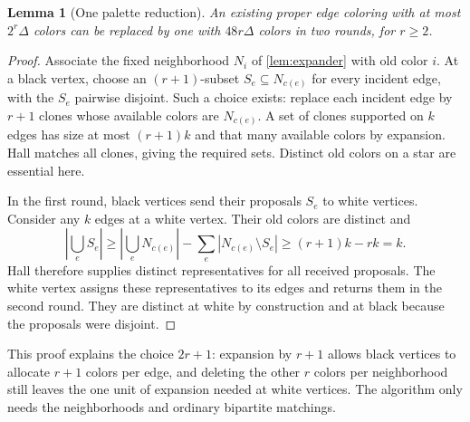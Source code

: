 \documentclass[11pt]{article}
\newtheorem{lemma}[theorem]{Lemma}
\theoremstyle{definition}
\theoremstyle{remark}
\newcommand{\abs}[1]{\left|#1\right|}
\begin{document}
\begin{lemma}[One palette reduction]\label{lem:expanderreduction}
An existing proper edge coloring with at most $2^r\Delta$ colors can be
replaced by one with $48r\Delta$ colors in two rounds, for $r\ge2$.
\end{lemma}
\begin{proof}
Associate the fixed neighborhood $N_i$ of \cref{lem:expander} with old
color $i$. At a black vertex, choose an $(r+1)$-subset $S_e\subseteq
N_{c(e)}$ for every incident edge, with the $S_e$ pairwise disjoint.
Such a choice exists: replace each incident edge by $r+1$ clones whose
available colors are $N_{c(e)}$. A set of clones supported on $k$ edges
has size at most $(r+1)k$ and that many available colors by expansion.
Hall matches all clones, giving the required sets. Distinct old colors
on a star are essential here.

In the first round, black vertices send their proposals $S_e$ to white
vertices. Consider any $k$ edges at a white vertex. Their old colors
are distinct and
\begin{equation}\label{eq:deletedneighbors}
 \abs{\bigcup_e S_e}
 \ge\abs{\bigcup_e N_{c(e)}}-\sum_e\abs{N_{c(e)}\setminus S_e}
 \ge(r+1)k-rk=k.
\end{equation}
Hall therefore supplies distinct representatives for all received
proposals. The white vertex assigns these representatives to its edges
and returns them in the second round. They are distinct at white by
construction and at black because the proposals were disjoint.
\end{proof}

This proof explains the choice $2r+1$: expansion by $r+1$ allows black
vertices to allocate $r+1$ colors per edge, and deleting the other $r$
colors per neighborhood still leaves the one unit of expansion needed
at white vertices. The algorithm only needs the neighborhoods and
ordinary bipartite matchings.
\end{document}
